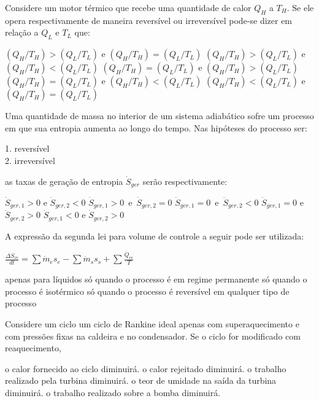 \documentclass[answers]{exam}
\begin{document}
\begin{multicols}{2}
  \begin{questions}
    \question Considere um motor térmico que recebe uma quantidade de calor $Q_H$ a $T_H$. Se ele opera respectivamente de maneira reversível ou irreversível pode-se dizer em relação a $Q_L$ e $T_L$ que:
    \begin{checkboxes}
      \choice $(Q_H / T_H) > (Q_L / T_L)$ e $(Q_H / T_H) = (Q_L / T_L)$
      \choice $(Q_H / T_H) > (Q_L / T_L)$ e $(Q_H / T_H) < (Q_L / T_L)$
      \choice $(Q_H / T_H) = (Q_L / T_L)$ e $(Q_H / T_H) > (Q_L / T_L)$
      \CorrectChoice $(Q_H / T_H) = (Q_L / T_L)$ e $(Q_H / T_H) < (Q_L / T_L)$
      \choice $(Q_H / T_H) < (Q_L / T_L)$ e $(Q_H / T_H) = (Q_L / T_L)$
    \end{checkboxes}


    \question Uma quantidade de massa no interior de um sistema adiabático sofre um processo em que sua entropia aumenta ao longo do tempo. Nas hipóteses do processo ser:

    1. reversível\\
    2. irreversível

    as taxas de geração de entropia $\dot S_{ger}$ serão respectivamente:
    \begin{checkboxes}
      \choice $\dot S_{ger, 1} > 0$ e $\dot S_{ger, 2} < 0$
      \choice $\dot S_{ger, 1} > 0$\ e\ $\dot S_{ger, 2} = 0$
      \choice $\dot S_{ger, 1} = 0$\ e\ $\dot S_{ger, 2} < 0$
      \CorrectChoice $\dot S_{ger, 1} = 0$ e $\dot S_{ger, 2} > 0$
      \choice $\dot S_{ger, 1} < 0$ e $\dot S_{ger, 2} > 0$
    \end{checkboxes}


    \question A expressão da segunda lei para volume de controle a seguir pode ser utilizada:

    $\frac{\Delta S_{vc}}{dt} = \sum \dot m_e s_e - \sum \dot m_s s_s + \sum \frac{\dot Q_{vc}}{T}$
    \begin{checkboxes}
      \choice apenas para líquidos
      \choice só quando o processo é em regime permanente
      \choice só quando o processo é isotérmico
      \CorrectChoice só quando o processo é reversível
      \choice em qualquer tipo de processo
    \end{checkboxes}



    \question Considere um ciclo um ciclo de Rankine ideal apenas com superaquecimento e com pressões fixas na caldeira e no condensador. Se o ciclo for modificado com reaquecimento,
    \begin{checkboxes}
      \choice o calor fornecido ao ciclo diminuirá.
      \choice o calor rejeitado diminuirá.
      \choice o trabalho realizado pela turbina diminuirá.
      \CorrectChoice o teor de umidade na saída da turbina diminuirá.
      \choice o trabalho realizado sobre a bomba diminuirá.
    \end{checkboxes}




\end{questions}
\end{multicols}
\end{document}
